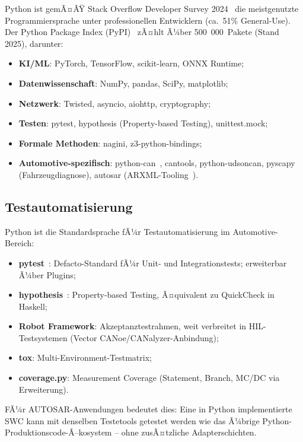 ﻿\documentclass[12pt,a4paper,twoside]{article}
\begin{document}
Python ist gemÃ¤ÃŸ Stack Overflow Developer Survey 2024~\cite{stackoverflow_survey2024}
die meistgenutzte Programmiersprache unter professionellen
Entwicklern (ca.\ 51\% General-Use).
Der Python Package Index (PyPI)~\cite{pypi_stats2024} zÃ¤hlt Ã¼ber
500~000~Pakete (Stand 2025), darunter:

\begin{itemize}
  \item \textbf{KI/ML}: PyTorch, TensorFlow, scikit-learn, ONNX Runtime;
  \item \textbf{Datenwissenschaft}: NumPy, pandas, SciPy, matplotlib;
  \item \textbf{Netzwerk}: Twisted, asyncio, aiohttp, cryptography;
  \item \textbf{Testen}: pytest, hypothesis (Property-based Testing), unittest.mock;
  \item \textbf{Formale Methoden}: nagini, z3-python-bindings;
  \item \textbf{Automotive-spezifisch}: python-can~\cite{python_can2023},
        cantools, python-udsoncan, pyscapy (Fahrzeugdiagnose),
        autosar (ARXML-Tooling~\cite{pyautosar_gh}).
\end{itemize}

\subsection{Testautomatisierung}
\label{subsec:testing}

Python ist die Standardsprache fÃ¼r Testautomatisierung im Automotive-Bereich:

\begin{itemize}
  \item \textbf{pytest}~\cite{pytest2023}: Defacto-Standard fÃ¼r Unit- und
        Integrationstests; erweiterbar Ã¼ber Plugins;
  \item \textbf{hypothesis}~\cite{hypothesis2019}: Property-based Testing,
        Ã¤quivalent zu QuickCheck in Haskell;
  \item \textbf{Robot Framework}: Akzeptanztestrahmen, weit verbreitet in
        HIL-Testsystemen (Vector CANoe/CANalyzer-Anbindung);
  \item \textbf{tox}: Multi-Environment-Testmatrix;
  \item \textbf{coverage.py}: Measurement Coverage (Statement, Branch, MC/DC via
        Erweiterung).
\end{itemize}

FÃ¼r AUTOSAR-Anwendungen bedeutet dies: Eine in Python implementierte
SWC kann mit denselben Testetools getestet werden wie das Ã¼brige
Python-Produktionscode-Ã–kosystem -- ohne zusÃ¤tzliche Adapterschichten.
\end{document}
